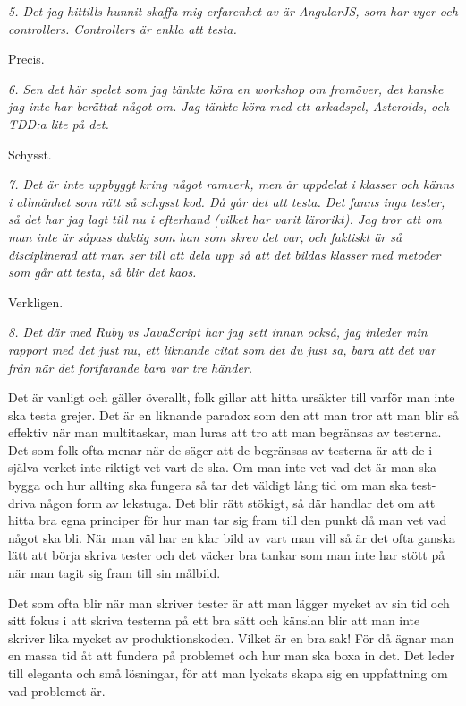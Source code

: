 \documentclass[11pt]{article}
\begin{document}
\emph{5. Det jag hittills hunnit skaffa mig erfarenhet av är AngularJS, som har vyer och controllers. Controllers är enkla att testa.}

Precis.

\emph{6. Sen det här spelet som jag tänkte köra en workshop om framöver, det kanske jag inte har berättat något om. Jag tänkte köra med ett arkadspel, Asteroids, och TDD:a lite på det.}

Schysst.

\emph{7. Det är inte uppbyggt kring något ramverk, men är uppdelat i klasser och känns i allmänhet som rätt så schysst kod. Då går det att testa. Det fanns inga tester, så det har jag lagt till nu i efterhand (vilket har varit lärorikt). Jag tror att om man inte är såpass duktig som han som skrev det var, och faktiskt är så disciplinerad att man ser till att dela upp så att det bildas klasser med metoder som går att testa, så blir det kaos.}

Verkligen.

\emph{8. Det där med Ruby vs JavaScript har jag sett innan också, jag inleder min rapport med det just nu, ett liknande citat som det du just sa, bara att det var från när det fortfarande bara var tre händer.}

Det är vanligt och gäller överallt, folk gillar att hitta ursäkter till varför man inte ska testa grejer. Det är en liknande paradox som den att man tror att man blir så effektiv när man multitaskar, man luras att tro att man begränsas av testerna. Det som folk ofta menar när de säger att de begränsas av testerna är att de i själva verket inte riktigt vet vart de ska. Om man inte vet vad det är man ska bygga och hur allting ska fungera så tar det väldigt lång tid om man ska test-driva någon form av lekstuga. Det blir rätt stökigt, så där handlar det om att hitta bra egna principer för hur man tar sig fram till den punkt då man vet vad något ska bli. När man väl har en klar bild av vart man vill så är det ofta ganska lätt att börja skriva tester och det väcker bra tankar som man inte har stött på när man tagit sig fram till sin målbild.

Det som ofta blir när man skriver tester är att man lägger mycket av sin tid och sitt fokus i att skriva testerna på ett bra sätt och känslan blir att man inte skriver lika mycket av produktionskoden. Vilket är en bra sak! För då ägnar man en massa tid åt att fundera på problemet och hur man ska boxa in det. Det leder till eleganta och små lösningar, för att man lyckats skapa sig en uppfattning om vad problemet är.
\end{document}
